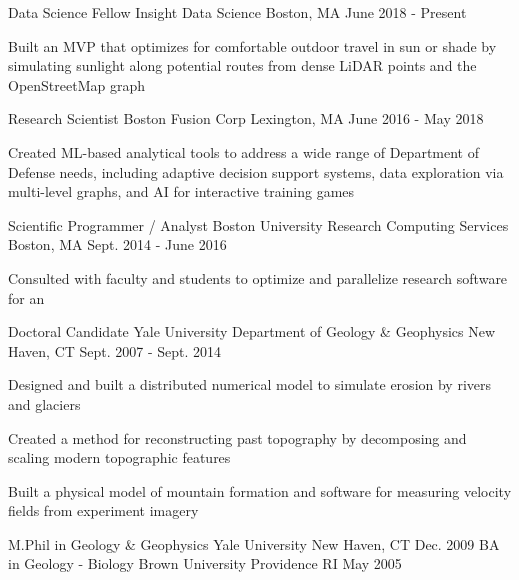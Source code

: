 \documentclass[11pt, a4paper]{awesome-cv}
\begin{document}
\begin{cventries}
  \cventrytight
    {Data Science Fellow}
    {Insight Data Science}
    {Boston, MA}
    {June 2018 - Present}
    {
    \begin{cvitems}
      \item Built an MVP  that optimizes for comfortable outdoor travel in sun or shade by simulating sunlight along potential routes from dense LiDAR points and the OpenStreetMap graph
    \end{cvitems}
    }

  \cventrytight
    {Research Scientist}
    {Boston Fusion Corp}
    {Lexington, MA}
    {June 2016 - May 2018}
    {
      \begin{cvitems}
        \item Created ML-based analytical tools to address a wide range of Department of Defense needs, including adaptive decision support systems, data exploration via multi-level graphs, and AI for interactive training games
      \end{cvitems}
    }

  \cventrytight
    {Scientific Programmer / Analyst}
    {Boston University Research Computing Services}
    {Boston, MA}
    {Sept. 2014 - June 2016}
    {
      \begin{cvitems}
        \item {Consulted with faculty and students to optimize and parallelize research software for an } 
      \end{cvitems}
    }

  \cventrytight
    {Doctoral Candidate}
    {Yale University Department of Geology \& Geophysics}
    {New Haven, CT}
    {Sept. 2007 - Sept. 2014}
    {
      \begin{cvitems}
        \item {Designed and built a distributed numerical model to simulate erosion by rivers and glaciers}
        \item {Created a method for reconstructing past topography by decomposing and scaling modern topographic features}
        \item {Built a physical model of mountain formation and software for measuring velocity fields from experiment imagery}
      \end{cvitems} 
    }

\end{cventries}

\vspace{-1em}

\begin{cventries}
  \cventry
    {M.Phil in Geology \& Geophysics}
    {Yale University}
    {New Haven, CT}
    {Dec. 2009}
    {}
  \cventry
    {BA in Geology - Biology}
    {Brown University}
    {Providence RI}
    {May 2005}
    {}
\end{cventries}
\end{document}
